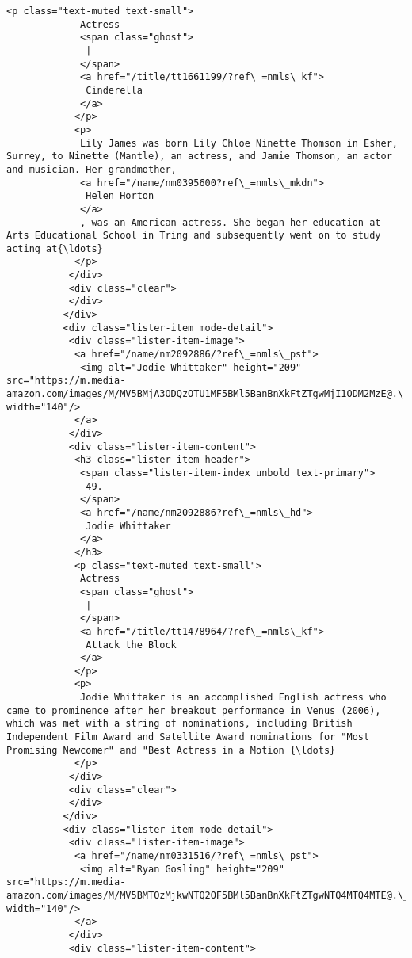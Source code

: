 \documentclass[11pt]{article}
\begin{document}
\begin{Verbatim}[commandchars=\\\{\}]
            <p class="text-muted text-small">
             Actress
             <span class="ghost">
              |
             </span>
             <a href="/title/tt1661199/?ref\_=nmls\_kf">
              Cinderella
             </a>
            </p>
            <p>
             Lily James was born Lily Chloe Ninette Thomson in Esher, Surrey, to Ninette (Mantle), an actress, and Jamie Thomson, an actor and musician. Her grandmother,
             <a href="/name/nm0395600?ref\_=nmls\_mkdn">
              Helen Horton
             </a>
             , was an American actress. She began her education at Arts Educational School in Tring and subsequently went on to study acting at{\ldots}
            </p>
           </div>
           <div class="clear">
           </div>
          </div>
          <div class="lister-item mode-detail">
           <div class="lister-item-image">
            <a href="/name/nm2092886/?ref\_=nmls\_pst">
             <img alt="Jodie Whittaker" height="209" src="https://m.media-amazon.com/images/M/MV5BMjA3ODQzOTU1MF5BMl5BanBnXkFtZTgwMjI1ODM2MzE@.\_V1\_UY209\_CR7,0,140,209\_AL\_.jpg" width="140"/>
            </a>
           </div>
           <div class="lister-item-content">
            <h3 class="lister-item-header">
             <span class="lister-item-index unbold text-primary">
              49.
             </span>
             <a href="/name/nm2092886?ref\_=nmls\_hd">
              Jodie Whittaker
             </a>
            </h3>
            <p class="text-muted text-small">
             Actress
             <span class="ghost">
              |
             </span>
             <a href="/title/tt1478964/?ref\_=nmls\_kf">
              Attack the Block
             </a>
            </p>
            <p>
             Jodie Whittaker is an accomplished English actress who came to prominence after her breakout performance in Venus (2006), which was met with a string of nominations, including British Independent Film Award and Satellite Award nominations for "Most Promising Newcomer" and "Best Actress in a Motion {\ldots}
            </p>
           </div>
           <div class="clear">
           </div>
          </div>
          <div class="lister-item mode-detail">
           <div class="lister-item-image">
            <a href="/name/nm0331516/?ref\_=nmls\_pst">
             <img alt="Ryan Gosling" height="209" src="https://m.media-amazon.com/images/M/MV5BMTQzMjkwNTQ2OF5BMl5BanBnXkFtZTgwNTQ4MTQ4MTE@.\_V1\_UY209\_CR12,0,140,209\_AL\_.jpg" width="140"/>
            </a>
           </div>
           <div class="lister-item-content">

\end{Verbatim}
\end{document}

